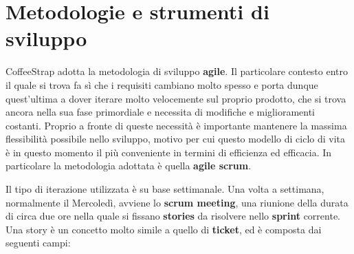 \section{Metodologie e strumenti di sviluppo}

CoffeeStrap adotta la metodologia di sviluppo \textbf{\gls{agile}}. Il particolare contesto entro il quale si trova fa sì che i requisiti cambiano molto spesso e porta dunque quest'ultima a dover iterare molto velocemente sul proprio prodotto, che si trova ancora nella sua fase primordiale e necessita di modifiche e miglioramenti costanti. Proprio a fronte di queste necessità è importante mantenere la massima flessibilità possibile nello sviluppo, motivo per cui questo modello di ciclo di vita è in questo momento il più conveniente in termini di efficienza ed efficacia. In particolare la metodologia adottata è quella \textbf{agile \gls{scrum}}.

Il tipo di iterazione utilizzata è su base settimanale. Una volta a settimana, normalmente il Mercoledì, avviene lo \textbf{scrum meeting}, una riunione della durata di circa due ore nella quale si fissano \textbf{stories} da risolvere nello \textbf{\gls{sprint}} corrente. Una story è un concetto molto simile a quello di \textbf{ticket}, ed è composta dai seguenti campi:

